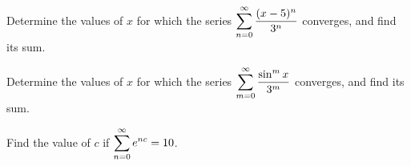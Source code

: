 \documentclass[notes]{subfiles}
\begin{document}
		\begin{ex}
			Determine the values of $x$ for which the series $\displaystyle \sum_{n = 0}^\infty \dfrac{(x-5)^n}{3^n}$ converges, and find its sum.
		\end{ex}
			
		\begin{ex}
			Determine the values of $x$ for which the series $\displaystyle \sum_{m = 0}^\infty \dfrac{\sin^mx}{3^m}$ converges, and find its sum.
		\end{ex}
			
		\begin{ex}
			Find the value of $c$ if $\displaystyle \sum_{n = 0}^\infty e^{nc} = 10$.
		\end{ex}
\clearpage
\end{document}
